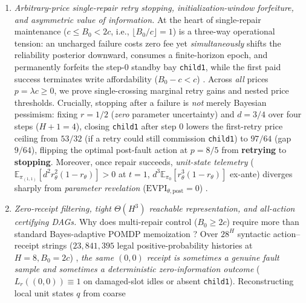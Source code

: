 \documentclass[11pt,a4paper]{article}
\begin{document}
\begin{enumerate}
  genealogical store requires an explicit measure-preserving commutation
  bridge rather than defining a reduced POMDP by fiat.
\item
  \emph{Arbitrary-price single-repair retry stopping,
  initialization-window forfeiture, and asymmetric value of
  information.} At the heart of single-repair maintenance
  (\(c \le B_0 < 2c\), i.e., \(\lfloor B_0/c\rfloor = 1\)) is a
  three-way operational tension: an uncharged failure costs zero fee yet
  \emph{simultaneously} shifts the reliability posterior downward,
  consumes a finite-horizon epoch, and permanently forfeits the
  step-\(0\) standby bay \texttt{child1}, while the first paid success
  terminates write affordability (\(B_0 - c < c\))
  \citep{wald1947, raiffaSchlaifer1961, martin1967, degroot1970, berryFristedt1979, fristedtBerry1988, aghion1991, duff2002, ross2011, ghavamzadeh2015, barronYechiali2017}.
  Across \emph{all} prices \(p = \lambda c \ge 0\), we prove
  single-crossing marginal retry gains and nested price thresholds.
  Crucially, stopping after a failure is \emph{not} merely Bayesian
  pessimism: fixing \(r = 1/2\) (\emph{zero} parameter uncertainty) and
  \(d = 3/4\) over four steps (\(H + 1 = 4\)), closing \texttt{child1}
  after step \(0\) lowers the first-retry price ceiling from \(53/32\)
  (if a retry could still commission \texttt{child1}) to \(97/64\) (gap
  \(9/64\)), flipping the optimal post-fault action at \(p = 8/5\) from
  \textbf{retrying} to \textbf{stopping}. Moreover, once repair
  succeeds, \emph{unit-state telemetry}
  (\(\mathbb{E}_{\pi_{(1,1)}}[d^2 r_\theta^2(1 - r_\theta)] > 0\) at
  \(t=1\), \(d^3\mathbb{E}_{\pi_0}[r_\theta^3(1 - r_\theta)]\) ex-ante)
  diverges sharply from \emph{parameter revelation}
  (\(\mathrm{EVPI}_{\theta,\mathrm{post}} = 0\))
  \citep{blackwell1953, howard1966}.
\item
  \emph{Zero-receipt filtering, tight \(\Theta(H^3)\) reachable
  representation, and all-action certifying DAGs.} Why does multi-repair
  control (\(B_0 \ge 2c\)) require more than standard Bayes-adaptive
  POMDP memoization \citep{ross2011, meuleau1999, poupartBoutilier2003}?
  Over \(28^H\) syntactic action--receipt strings (\(23,841,395\) legal
  positive-probability histories at \(H=8, B_0=2c\))
  \citep{papadimitriouTsitsiklis1987, lovejoy1991, cassandra1997, kaelbling1998, madani2003},
  \emph{the same \((0,0)\) receipt is sometimes a genuine fault sample
  and sometimes a deterministic zero-information outcome}
  (\(L_r((0,0)) \equiv 1\) on damaged-slot idles or absent
  \texttt{child1}). Reconstructing local unit states \(q\) from coarse

\end{enumerate}
\end{document}
